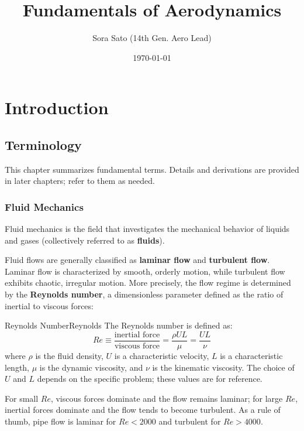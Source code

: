 \documentclass[uplatex,dvipdfmx,a4paper,11pt]{report}
\newcommand{\keyword}[1]{\textcolor{mainblue}{\textbf{#1}}}
\numberwithin{equation}{chapter}
\begin{document}
\title{\Huge\textbf{Fundamentals of Aerodynamics}}
\author{Sora Sato (14th Gen. Aero Lead)\footnotemark}
\date{\today}
\maketitle

\tableofcontents


\chapter{Introduction}
\section{Terminology}
This chapter summarizes fundamental terms. Details and derivations are provided in later chapters; refer to them as needed.

\subsection{Fluid Mechanics}
Fluid mechanics is the field that investigates the mechanical behavior of liquids and gases (collectively referred to as \keyword{fluids}).

\enskip

Fluid flows are generally classified as \keyword{laminar flow} and \keyword{turbulent flow}. Laminar flow is characterized by smooth, orderly motion, while turbulent flow exhibits chaotic, irregular motion. More precisely, the flow regime is determined by the \keyword{Reynolds number}, a dimensionless parameter defined as the ratio of inertial to viscous forces:
\begin{definition}{Reynolds Number}{Reynolds}{}
  The Reynolds number is defined as:
  \begin{equation}
    \textit{Re} \equiv \frac{\text{inertial force}}{\text{viscous force}}
    = \frac{\rho UL}{\mu} = \frac{UL}{\nu}
  \end{equation}
  where $\rho$ is the fluid density, $U$ is a characteristic velocity, $L$ is a characteristic length, $\mu$ is the dynamic viscosity, and $\nu$ is the kinematic viscosity. The choice of $U$ and $L$ depends on the specific problem; these values are for reference.
\end{definition}
For small $\textit{Re}$, viscous forces dominate and the flow remains laminar; for large $\textit{Re}$, inertial forces dominate and the flow tends to become turbulent. As a rule of thumb, pipe flow is laminar for $\textit{Re} < 2000$ and turbulent for $\textit{Re} > 4000$.
\end{document}
